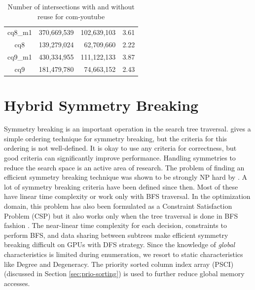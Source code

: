 {\begin{table}[tbp]
\begin{tabular}{c|rrc}
        cq8\_m1                                                                & 370,669,539                                                            & 102,639,103 & 3.61 \\
        cq8                                                                    & 139,279,024                                                            & 62,709,660  & 2.22 \\
        cq9\_m1                                                                & 430,334,955                                                            & 111,122,133 & 3.87 \\
        cq9                                                                    & 181,479,780                                                            & 74,663,152  & 2.43 \\
    \end{tabular}%
    \caption{Number of intersections with and without reuse for com-youtube}
    \label{tab:reuse-improvement}
\end{table}

\section{Hybrid Symmetry Breaking}\label{sec:hy-symbreak}
Symmetry breaking is an important operation in the search tree traversal.
\cite{ullman_sgm} gives a simple ordering technique for symmetry breaking, but the criteria for this ordering is not well-defined.
It is okay to use any criteria for correctness, but good criteria can significantly improve performance.
Handling symmetries to reduce the search space is an active area of research.
The problem of finding an efficient symmetry breaking technique was shown to be strongly NP hard by \cite{crawford-sb-np-hard}.
A lot of symmetry breaking criteria have been defined since then. Most of these have linear time complexity or work only with BFS traversal.
In  the optimization domain, this problem has also been formulated as a Constraint Satisfaction Problem (CSP) but it also works only when the tree traversal is done in BFS fashion \cite{sb-CSP}.
The near-linear time complexity for each decision, constraints to perform BFS, and data sharing between subtrees make efficient symmetry breaking difficult on GPUs with DFS strategy.
Since the knowledge of \textit{global} characteristics is limited during enumeration, we resort to static characteristics like Degree and Degeneracy.
The priority sorted column index array (PSCI) (discussed in Section \ref{sec:prio-sorting}) is used to further reduce global memory accesses.

}
